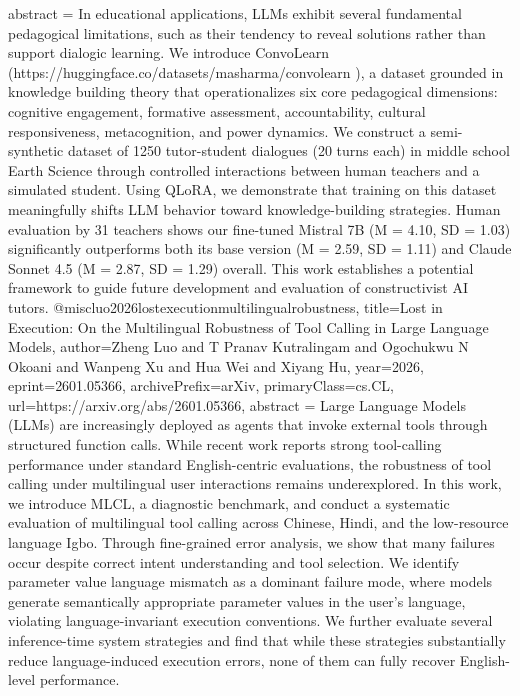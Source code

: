 {      abstract = {In educational applications, LLMs exhibit several fundamental pedagogical limitations, such as their tendency to reveal solutions rather than support dialogic learning. We introduce ConvoLearn (https://huggingface.co/datasets/masharma/convolearn ), a dataset grounded in knowledge building theory that operationalizes six core pedagogical dimensions: cognitive engagement, formative assessment, accountability, cultural responsiveness, metacognition, and power dynamics. We construct a semi-synthetic dataset of 1250 tutor-student dialogues (20 turns each) in middle school Earth Science through controlled interactions between human teachers and a simulated student. Using QLoRA, we demonstrate that training on this dataset meaningfully shifts LLM behavior toward knowledge-building strategies. Human evaluation by 31 teachers shows our fine-tuned Mistral 7B (M = 4.10, SD = 1.03) significantly outperforms both its base version (M = 2.59, SD = 1.11) and Claude Sonnet 4.5 (M = 2.87, SD = 1.29) overall. This work establishes a potential framework to guide future development and evaluation of constructivist AI tutors.}
}@misc{luo2026lostexecutionmultilingualrobustness,
      title={Lost in Execution: On the Multilingual Robustness of Tool Calling in Large Language Models}, 
      author={Zheng Luo and T Pranav Kutralingam and Ogochukwu N Okoani and Wanpeng Xu and Hua Wei and Xiyang Hu},
      year={2026},
      eprint={2601.05366},
      archivePrefix={arXiv},
      primaryClass={cs.CL},
      url={https://arxiv.org/abs/2601.05366},
      abstract = {Large Language Models (LLMs) are increasingly deployed as agents that invoke external tools through structured function calls. While recent work reports strong tool-calling performance under standard English-centric evaluations, the robustness of tool calling under multilingual user interactions remains underexplored. In this work, we introduce MLCL, a diagnostic benchmark, and conduct a systematic evaluation of multilingual tool calling across Chinese, Hindi, and the low-resource language Igbo. Through fine-grained error analysis, we show that many failures occur despite correct intent understanding and tool selection. We identify parameter value language mismatch as a dominant failure mode, where models generate semantically appropriate parameter values in the user's language, violating language-invariant execution conventions. We further evaluate several inference-time system strategies and find that while these strategies substantially reduce language-induced execution errors, none of them can fully recover English-level performance.}
}
